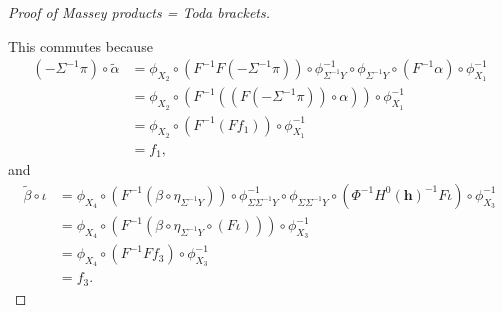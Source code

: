 \begin{proof}[Proof of Massey products = Toda brackets]
\begin{center}
    \end{center}
    This commutes because
    \begin{align*}
        (- \Sigma^{-1} \pi) \circ \tilde{\alpha} &= \phi_{X_2} \circ (F^{-1} F (- \Sigma^{-1} \pi)) \circ \phi^{-1}_{\Sigma^{-1} Y} \circ \phi_{\Sigma^{-1} Y} \circ (F^{-1} \alpha) \circ \phi^{-1}_{X_1}\\
        &= \phi_{X_2} \circ (
            F^{-1} (
                (F (- \Sigma^{-1} \pi)) \circ \alpha
                )
            ) \circ \phi^{-1}_{X_1} \\
        &= \phi_{X_2} \circ (F^{-1} (F f_1)) \circ \phi^{-1}_{X_1} \\
        &= f_1,
    \end{align*}
    and
    \begin{align*}
        \tilde{\beta} \circ \iota &= \phi_{X_4} \circ (F^{-1} (\beta \circ \eta_{\Sigma^{-1} Y})) \circ \phi^{-1}_{\Sigma \Sigma^{-1} Y} \circ \phi_{\Sigma \Sigma^{-1} Y} \circ (\Phi^{-1} H^0(\mathbf{h})^{-1} F \iota) \circ \phi^{-1}_{X_3} \\
        &= \phi_{X_4} \circ (F^{-1}(\beta \circ \eta_{\Sigma^{-1} Y} \circ (F \iota))) \circ \phi^{-1}_{X_3} \\
        &= \phi_{X_4} \circ (F^{-1} F f_3) \circ \phi^{-1}_{X_3} \\
        &= f_3.
    \end{align*}


\end{proof}
